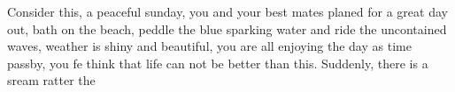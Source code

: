 Consider this, a peaceful sunday, you and your best mates planed for a great day out, bath on the beach, peddle the blue sparking water and ride the uncontained waves, weather is shiny and beautiful, you are all enjoying the day as time passby, you fe think that life can not be better than this. Suddenly, there is a sream ratter the 